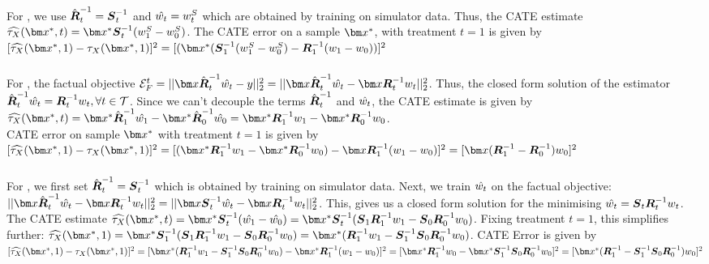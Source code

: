 \subsubsection{\simonly}
For \simonly, we use $\hat{\boldsymbol{R}}_t^{-1} = \boldsymbol{S}_t^{-1}$ and $\hat{w_{t}} = w_{t}^S$ which are obtained by training on simulator data. Thus, the CATE estimate $\ITExhat(\xb^*, t) = \xb^*\mat{S}_t^{-1}(\wbetas{1} - \wbetas{0})$. The CATE error on a sample $\xb^*$, with treatment $t=1$ is given by $[\ITExhat(\xb^*, 1) - \ITEx(\xb^*, 1)]^2 = [(\xb^* (\mat{S}_1^{-1}( \wbetas{1} - \wbetas{0}) - \mat{R}_1^{-1} (\wbeta{1} - \wbeta{0}))]^2$

\subsubsection{\realonly}
For \realonly, the factual objective $\ErrF^t = ||\xb \hat{\mat{R}}^{-1}_{t} \hat{\wbeta{t}} - y||_2^2 = ||\xb \hat{\mat{R}}^{-1}_{t} \hat{\wbeta{t}} - \xb \mat{R}_t^{-1} \wbeta{t}||_2^2$. Thus, the closed form solution of the estimator $\hat{\boldsymbol{R}}^{-1}_{t} \hat{w_{t}} = \boldsymbol{R}_t^{-1} w_{t}, \forall t \in \mathcal{T}$. Since we can't decouple the terms $\hat{\boldsymbol{R}}^{-1}_{t}$ and $ \hat{w_{t}}$, the CATE estimate is given by $\ITExhat(\xb^*, t) = \xb^* \hat{\mat{R}}^{-1}_{1} \hat{\wbeta{1}} - \xb^* \hat{\mat{R}}^{-1}_{0} \hat{\wbeta{0}} = \xb^* \mat{R}^{-1}_1 \wbeta{1} - \xb^* \mat{R}^{-1}_0 \wbeta{0}$.\\
CATE error on sample $\xb^*$ with treatment $t=1$ is given by $[\ITExhat(\xb^*, 1) - \ITEx(\xb^*, 1)]^2 = [(\xb^* \mat{R}^{-1}_1 \wbeta{1} - \xb^* \mat{R}^{-1}_0 \wbeta{0}) - \xb \mat{R}^{-1}_1 (\wbeta{1} - \wbeta{0})]^2 = [\xb (\mat{R}^{-1}_1 - \mat{R}^{-1}_0)\wbeta{0}]^2$

\subsubsection{\muonly}
For \muonly, we first set $\hat{\boldsymbol{R}}^{-1}_t = \boldsymbol{S}^{-1}_t$ which is obtained by training on simulator data. Next, we train $\hat{w_{t}}$ on the factual objective: $||\xb \hat{\mat{R}}^{-1}_t \hat{\wbeta{t}} - \xb \mat{R}_t^{-1} \wbeta{t}||_2^2 = ||\xb \mat{S}^{-1}_t \hat{\wbeta{t}} - \xb \mat{R}_t^{-1} \wbeta{t}||_2^2$. This, gives us a closed form solution for the minimising $\hat{w_{t}} = \boldsymbol{S}_t \boldsymbol{R}_t^{-1} w_{t}$. The CATE estimate $\ITExhat(\xb^*, t) = \xb^*\mat{S}_t^{-1}(\hat{\wbeta{1}} - \hat{\wbeta{0}}) = \xb^*\mat{S}_t^{-1}(\mat{S}_1 \mat{R}_1^{-1} \wbeta{1} - \mat{S}_0 \mat{R}_0^{-1} \wbeta{0})$. Fixing treatment $t=1$, this simplifies further: $\ITExhat(\xb^*, 1) = \xb^*\mat{S}_1^{-1}(\mat{S}_1 \mat{R}_1^{-1} \wbeta{1} - \mat{S}_0 \mat{R}_0^{-1} \wbeta{0}) = \xb^*(\mat{R}_1^{-1} \wbeta{1} - \mat{S}_1^{-1}\mat{S}_0 \mat{R}_0^{-1} \wbeta{0})$. CATE Error is given by $[\ITExhat(\xb^*, 1) - \ITEx(\xb^*, 1)]^2 = [\xb^*(\mat{R}_1^{-1} \wbeta{1} - \mat{S}_1^{-1}\mat{S}_0 \mat{R}_0^{-1} \wbeta{0}) - \xb^* \mat{R}_1^{-1} (\wbeta{1} - \wbeta{0})]^2 = [ \xb^* \mat{R}_1^{-1} \wbeta{0} -\xb^* \mat{S}_1^{-1}\mat{S}_0 \mat{R}_0^{-1} \wbeta{0}]^2 = [ \xb^* (\mat{R}_1^{-1} - \mat{S}_1^{-1}\mat{S}_0 \mat{R}_0^{-1}) \wbeta{0}]^2$

